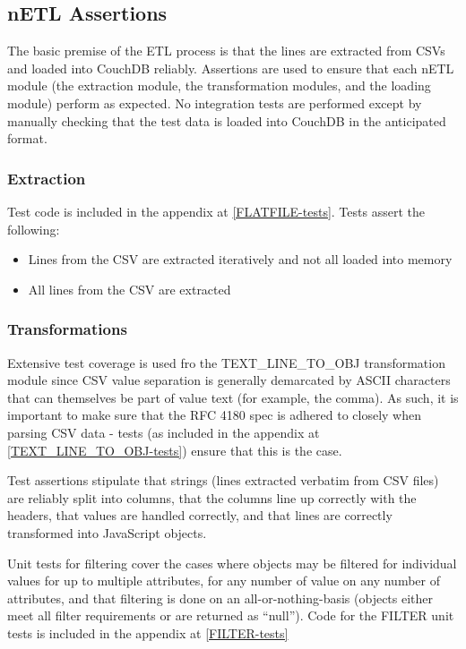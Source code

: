 \subsection{nETL Assertions}
The basic premise of the ETL process is that the lines are extracted from CSVs and loaded into CouchDB reliably. Assertions are used to ensure that each nETL module (the extraction module, the transformation modules, and the loading module) perform as expected. No integration tests are performed except by manually checking that the test data is loaded into CouchDB in the anticipated format.

\subsubsection{Extraction}
Test code is included in the appendix at \ref{FLATFILE-tests}. Tests assert the following:

\begin{itemize}
    \item Lines from the CSV are extracted iteratively and not all loaded into memory
    \item All lines from the CSV are extracted
\end{itemize}

\subsubsection{Transformations}
Extensive test coverage is used fro the TEXT\_LINE\_TO\_OBJ transformation module since CSV value separation is generally demarcated by ASCII characters that can themselves be part of value text (for example, the comma). As such, it is important to make sure that the RFC 4180 spec is adhered to closely when parsing CSV data - tests (as included in the appendix at \ref{TEXT_LINE_TO_OBJ-tests}) ensure that this is the case.

Test assertions stipulate that strings (lines extracted verbatim from CSV files) are reliably split into columns, that the columns line up correctly with the headers, that values are handled correctly, and that lines are correctly transformed into JavaScript objects.

Unit tests for filtering cover the cases where objects may be filtered for individual values for up to multiple attributes, for any number of value on any number of attributes, and that filtering is done on an all-or-nothing-basis (objects either meet all filter requirements or are returned as ``null''). Code for the FILTER unit tests is included in the appendix at \ref{FILTER-tests}

